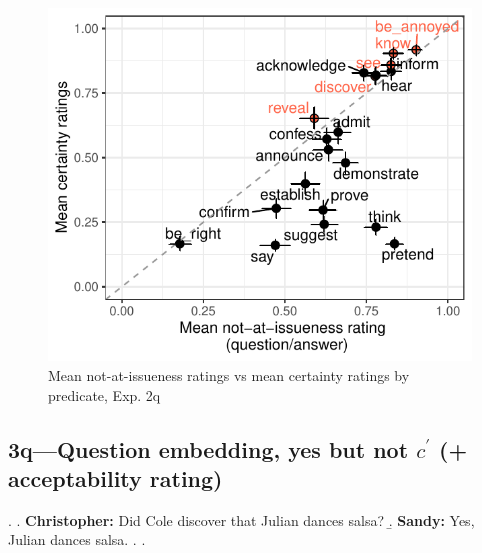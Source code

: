 \documentclass[11pt]{article}
\begin{document}
			\begin{figure}[h]
				\centering
				\includegraphics[]{figures/q2-correl.pdf}
				\caption{Mean not-at-issueness ratings vs mean certainty ratings by predicate, Exp. 2q}
				\label{fig:q2-correl}
			\end{figure}
		

	\subsection{3q---Question embedding, yes but not $c^\prime$ (+ acceptability rating)}
		\ex. \a. \textbf{Christopher:} Did Cole discover that Julian dances salsa?
				\b. \textbf{Sandy:} Yes, Julian dances salsa.
				\z.
			\z.
\end{document}
